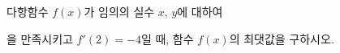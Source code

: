다항함수 $f(x)$가 임의의 실수 $x$, $y$에 대하여 \par\smallskip{}\par\smallskip\noindent 을 만족시키고 $f'(2)=-4$일 때, 함수 $f(x)$의 최댓값을 구하시오.
